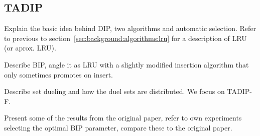 
\subsection{TADIP}
\label{sec:background:algorithms:tadip}

Explain the basic idea behind DIP, two algorithms and automatic selection. 
Refer to previous to section~\ref{sec:background:algorithms:lru} for a description of LRU (or aprox. LRU).

Describe BIP, angle it as LRU with a slightly modified insertion algorithm that only sometimes promotes on insert.

\begin{figure}[t]
\end{figure}

Describe set dueling and how the duel sets are distributed. We focus on TADIP-F.

Present some of the results from the original paper, refer to own experiments selecting the optimal BIP parameter, compare these to the original paper.
